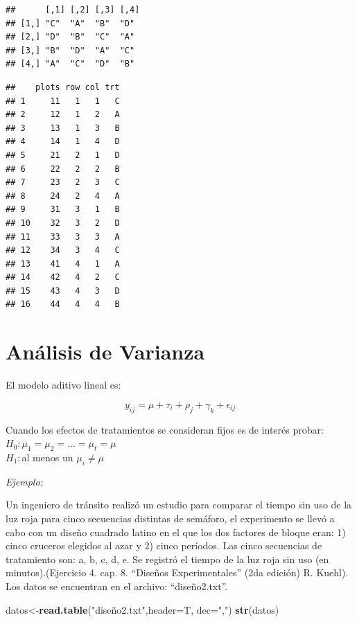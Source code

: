 \documentclass[]{book}
\newenvironment{Shaded}{\begin{snugshade}}{\end{snugshade}}
\newcommand{\KeywordTok}[1]{\textcolor[rgb]{0.13,0.29,0.53}{\textbf{#1}}}
\newcommand{\DataTypeTok}[1]{\textcolor[rgb]{0.13,0.29,0.53}{#1}}
\newcommand{\StringTok}[1]{\textcolor[rgb]{0.31,0.60,0.02}{#1}}
\newcommand{\OperatorTok}[1]{\textcolor[rgb]{0.81,0.36,0.00}{\textbf{#1}}}
\newcommand{\NormalTok}[1]{#1}
\begin{document}
\begin{verbatim}
##      [,1] [,2] [,3] [,4]
## [1,] "C"  "A"  "B"  "D" 
## [2,] "D"  "B"  "C"  "A" 
## [3,] "B"  "D"  "A"  "C" 
## [4,] "A"  "C"  "D"  "B"
\end{verbatim}

\begin{Shaded}
\end{Shaded}

\begin{verbatim}
##    plots row col trt
## 1     11   1   1   C
## 2     12   1   2   A
## 3     13   1   3   B
## 4     14   1   4   D
## 5     21   2   1   D
## 6     22   2   2   B
## 7     23   2   3   C
## 8     24   2   4   A
## 9     31   3   1   B
## 10    32   3   2   D
## 11    33   3   3   A
## 12    34   3   4   C
## 13    41   4   1   A
## 14    42   4   2   C
## 15    43   4   3   D
## 16    44   4   4   B
\end{verbatim}

\section{Análisis de Varianza}\label{analisis-de-varianza-2}

El modelo aditivo lineal es:

\[y_{ij}=\mu + \tau_i+\rho_j+\gamma_k+\epsilon_{ij}\]

Cuando los efectos de tratamientos se consideran fijos es de interés
probar:\\
\(H_0:\mu_1=\mu_2=... =\mu_t=\mu\)\\
\(H_1:\)al menos un \(\mu_i \neq \mu\)

\emph{Ejemplo:}

Un ingeniero de tránsito realizó un estudio para comparar el tiempo sin
uso de la luz roja para cinco secuencias distintas de semáforo, el
experimento se llevó a cabo con un diseño cuadrado latino en el que los
dos factores de bloque eran: 1) cinco cruceros elegidos al azar y 2)
cinco períodos. Las cinco secuencias de tratamiento son: a, b, c, d, e.
Se registró el tiempo de la luz roja sin uso (en minutos).(Ejercicio 4.
cap. 8. ``Diseños Experimentales'' (2da edición) R. Kuehl). Los datos se
encuentran en el archivo: ``diseño2.txt''.

\begin{Shaded}
\begin{Highlighting}[]
\NormalTok{datos<-}\KeywordTok{read.table}\NormalTok{(}\StringTok{"diseño2.txt"}\NormalTok{,}\DataTypeTok{header=}\NormalTok{T, }\DataTypeTok{dec=}\StringTok{","}\NormalTok{)}
\KeywordTok{str}\NormalTok{(datos)}
\end{Highlighting}
\end{Shaded}
\end{document}
